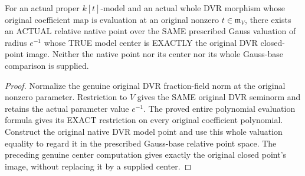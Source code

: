 \begin{theorem}
\label{berkovich:actual-dvr-prescribed-gauss-model-point}
\leanok
{}
For an actual proper $k[t]$-model and an actual whole DVR morphism whose original
coefficient map is evaluation at an original nonzero $t\in\mathfrak m_V$, there
exists an ACTUAL relative native point over the SAME prescribed Gauss valuation
of radius $e^{-1}$ whose TRUE model center is EXACTLY the original DVR
closed-point image. Neither the native point nor its center nor its whole
Gauss-base comparison is supplied.
\end{theorem}
\begin{proof}
Normalize the genuine original DVR fraction-field norm at the original nonzero
parameter. Restriction to $V$ gives the SAME original DVR seminorm and retains
the actual parameter value $e^{-1}$. The proved entire polynomial evaluation
formula gives its EXACT restriction on every original coefficient polynomial.
Construct the original native DVR model point and use this whole valuation
equality to regard it in the prescribed Gauss-base relative point space.
The preceding genuine center computation gives exactly the original closed
point's image, without replacing it by a supplied center.
\end{proof}
